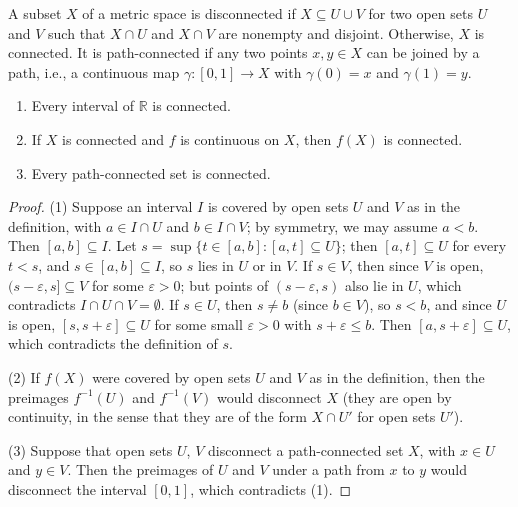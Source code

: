 \begin{definition}\label{A-def:connected}
    A subset $X$ of a metric space is disconnected if $X \subseteq U \cup V$ for two open sets $U$ and $V$ such that $X \cap U$ and $X \cap V$ are nonempty and disjoint. Otherwise, $X$ is connected. It is path-connected if any two points $x, y \in X$ can be joined by a path, i.e., a continuous map $\gamma: [0, 1] \to X$ with $\gamma(0) = x$ and $\gamma(1) = y$.
\end{definition}

\begin{proposition}\label{A-prop:connected}
    \begin{enumerate}
        \item Every interval of $\mathbb{R}$ is connected.
        \item If $X$ is connected and $f$ is continuous on $X$, then $f(X)$ is connected.
        \item Every path-connected set is connected.
    \end{enumerate}
\end{proposition}

\begin{proof}
    (1) Suppose an interval $I$ is covered by open sets $U$ and $V$ as in the definition, with $a \in I \cap U$ and $b \in I \cap V$; by symmetry, we may assume $a < b$. Then $[a, b] \subseteq I$. Let $s = \sup\{t \in [a, b] : [a, t] \subseteq U\}$; then $[a, t] \subseteq U$ for every $t < s$, and $s \in [a, b] \subseteq I$, so $s$ lies in $U$ or in $V$. If $s \in V$, then since $V$ is open, $(s - \varepsilon, s] \subseteq V$ for some $\varepsilon > 0$; but points of $(s - \varepsilon, s)$ also lie in $U$, which contradicts $I \cap U \cap V = \emptyset$. If $s \in U$, then $s \neq b$ (since $b \in V$), so $s < b$, and since $U$ is open, $[s, s + \varepsilon] \subseteq U$ for some small $\varepsilon > 0$ with $s + \varepsilon \leq b$. Then $[a, s + \varepsilon] \subseteq U$, which contradicts the definition of $s$.

    (2) If $f(X)$ were covered by open sets $U$ and $V$ as in the definition, then the preimages $f^{-1}(U)$ and $f^{-1}(V)$ would disconnect $X$ (they are open by continuity, in the sense that they are of the form $X \cap U'$ for open sets $U'$).

    (3) Suppose that open sets $U$, $V$ disconnect a path-connected set $X$, with $x \in U$ and $y \in V$. Then the preimages of $U$ and $V$ under a path from $x$ to $y$ would disconnect the interval $[0, 1]$, which contradicts (1).
\end{proof}


